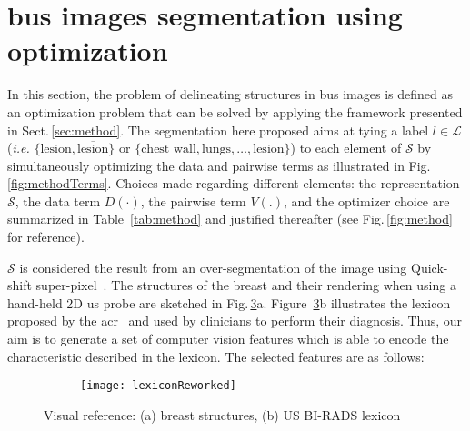 \section{\ac{bus} images segmentation using optimization}\label{sec:methodApp}
In this section, the problem of delineating structures in \ac{bus} images is defined as an optimization problem that can be solved by applying the framework presented in Sect.\,\ref{sec:method}.
The segmentation here proposed aims at tying a label $l\in\mathcal{L}$ (\emph{i.e.} $\{\text{lesion}, \overline{\text{lesion}}\}$ or $\{ \text{chest wall}, \text{lungs}, \dots, \text{lesion} \}$) to each element of $\mathcal{S}$ by simultaneously optimizing the data and pairwise terms as illustrated in Fig.\,\ref{fig:methodTerms}.
Choices made regarding different elements:
the representation $\mathcal{S}$, the data term $D(\cdot)$, the pairwise term $V(.)$, and the optimizer choice are summarized in Table~\ref{tab:method} and justified thereafter (see Fig.\,\ref{fig:method} for reference).

$\mathcal{S}$ is considered the result from an over-segmentation of the image using Quick-shift super-pixel~\cite{achanta2012slic}.
The structures of the breast and their rendering when using a hand-held 2D \ac{us} probe are sketched in Fig.\,\ref{fig:features}a. Figure~\ref{fig:features}b illustrates the lexicon proposed by the \ac{acr}~\cite{biradsus} and used by clinicians to perform their diagnosis. Thus, our aim is to generate a set of computer vision features which is able to encode the characteristic described in the lexicon.
The selected features are as follows:

\begin{figure}[t]
    \centering
    \begin{subfigure}[b]{0.30\textwidth}
        \centering
        \label{fig:features:breast}
    \end{subfigure}
    \hfill
    \begin{subfigure}[b]{0.65\textwidth}
        \centering
        \texttt{[image: lexiconReworked]}
        \label{fig:features:lexicon}
    \end{subfigure}
    \hfill
    \caption {{\footnotesize Visual reference: (a) breast structures, (b) US BI-RADS lexicon}}
    \label{fig:features}
\end{figure}

